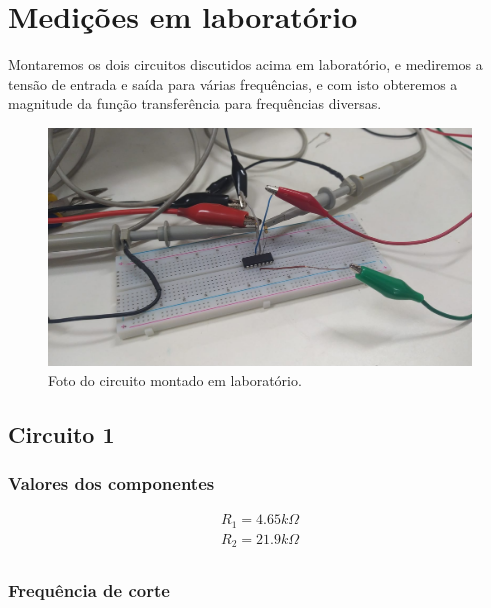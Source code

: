 
\section{Medições em laboratório}


Montaremos os dois circuitos discutidos acima em laboratório, e mediremos a tensão de entrada e saída para várias frequências, e com isto obteremos a magnitude da função transferência para frequências diversas.


\begin{figure}[h]
    \centering
    \includegraphics[width=1\columnwidth]{images/circuitoreal.jpeg}
    \caption{Foto do circuito montado em laboratório.}
\end{figure}


\subsection{Circuito 1}


\subsubsection{Valores dos componentes}


\begin{equation}
    \begin{aligned}
        R_1 = 4.65k \varOmega \\
        R_2 = 21.9k \varOmega \\
    \end{aligned}
\end{equation}


\subsubsection{Frequência de corte}


